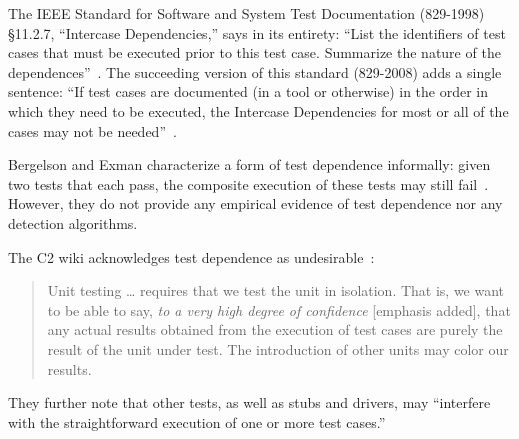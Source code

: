 The IEEE Standard for Software and System Test
Documentation (829-1998) \S 11.2.7, ``Intercase
Dependencies,'' says in its entirety: ``List the identifiers of
test cases that must be executed prior to this test
case. Summarize
the nature of the dependences''~\cite{IEEE:829-1998}.  The succeeding version of this
standard (829-2008) adds a single sentence: ``If
test cases are documented (in a tool or otherwise) in the order in
which they need to be executed, the Intercase Dependencies for most or
all of the cases may not be needed''~\cite{IEEE:829-2008}.





Bergelson and Exman characterize a form of test dependence informally:
given two tests that each pass, the composite
execution of these tests may still
fail~\cite[p.~38]{bergelsonetal:EEE:2006}.
However, they do not provide any empirical evidence of
test dependence nor any detection algorithms.

The C2 wiki acknowledges test dependence as undesirable~\cite{unit-test-def}:
\tinysqueeze
\begin{quote}
Unit testing \dots  
requires that we test the unit in isolation. That is, we
want to be able to say, \emph{to a very high degree of confidence} [emphasis added], that
any actual results obtained from the execution of test cases are
purely the result of the unit under test. The introduction of
other units may color our results.
\end{quote}
\tinysqueeze
They further note that other tests, as well as stubs and drivers,
may ``interfere with the straightforward
execution of one or more test cases.''


